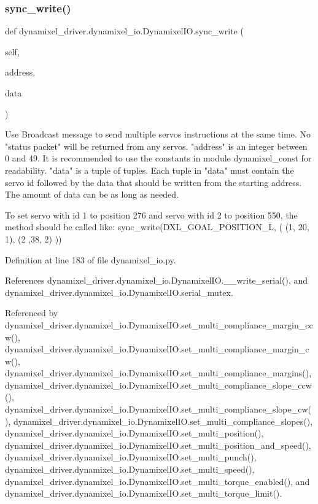 \subsubsection{\texorpdfstring{sync\+\_\+write()}{sync\_write()}}
{\footnotesize\ttfamily def dynamixel\+\_\+driver.\+dynamixel\+\_\+io.\+Dynamixel\+I\+O.\+sync\+\_\+write (\begin{DoxyParamCaption}\item[{}]{self,  }\item[{}]{address,  }\item[{}]{data }\end{DoxyParamCaption})}

\begin{DoxyVerb}Use Broadcast message to send multiple servos instructions at the
same time. No "status packet" will be returned from any servos.
"address" is an integer between 0 and 49. It is recommended to use the
constants in module dynamixel_const for readability. "data" is a tuple of
tuples. Each tuple in "data" must contain the servo id followed by the
data that should be written from the starting address. The amount of
data can be as long as needed.

To set servo with id 1 to position 276 and servo with id 2 to position
550, the method should be called like:
    sync_write(DXL_GOAL_POSITION_L, ( (1, 20, 1), (2 ,38, 2) ))
\end{DoxyVerb}
 

Definition at line 183 of file dynamixel\+\_\+io.\+py.



References dynamixel\+\_\+driver.\+dynamixel\+\_\+io.\+Dynamixel\+I\+O.\+\_\+\+\_\+write\+\_\+serial(), and dynamixel\+\_\+driver.\+dynamixel\+\_\+io.\+Dynamixel\+I\+O.\+serial\+\_\+mutex.



Referenced by dynamixel\+\_\+driver.\+dynamixel\+\_\+io.\+Dynamixel\+I\+O.\+set\+\_\+multi\+\_\+compliance\+\_\+margin\+\_\+ccw(), dynamixel\+\_\+driver.\+dynamixel\+\_\+io.\+Dynamixel\+I\+O.\+set\+\_\+multi\+\_\+compliance\+\_\+margin\+\_\+cw(), dynamixel\+\_\+driver.\+dynamixel\+\_\+io.\+Dynamixel\+I\+O.\+set\+\_\+multi\+\_\+compliance\+\_\+margins(), dynamixel\+\_\+driver.\+dynamixel\+\_\+io.\+Dynamixel\+I\+O.\+set\+\_\+multi\+\_\+compliance\+\_\+slope\+\_\+ccw(), dynamixel\+\_\+driver.\+dynamixel\+\_\+io.\+Dynamixel\+I\+O.\+set\+\_\+multi\+\_\+compliance\+\_\+slope\+\_\+cw(), dynamixel\+\_\+driver.\+dynamixel\+\_\+io.\+Dynamixel\+I\+O.\+set\+\_\+multi\+\_\+compliance\+\_\+slopes(), dynamixel\+\_\+driver.\+dynamixel\+\_\+io.\+Dynamixel\+I\+O.\+set\+\_\+multi\+\_\+position(), dynamixel\+\_\+driver.\+dynamixel\+\_\+io.\+Dynamixel\+I\+O.\+set\+\_\+multi\+\_\+position\+\_\+and\+\_\+speed(), dynamixel\+\_\+driver.\+dynamixel\+\_\+io.\+Dynamixel\+I\+O.\+set\+\_\+multi\+\_\+punch(), dynamixel\+\_\+driver.\+dynamixel\+\_\+io.\+Dynamixel\+I\+O.\+set\+\_\+multi\+\_\+speed(), dynamixel\+\_\+driver.\+dynamixel\+\_\+io.\+Dynamixel\+I\+O.\+set\+\_\+multi\+\_\+torque\+\_\+enabled(), and dynamixel\+\_\+driver.\+dynamixel\+\_\+io.\+Dynamixel\+I\+O.\+set\+\_\+multi\+\_\+torque\+\_\+limit().


